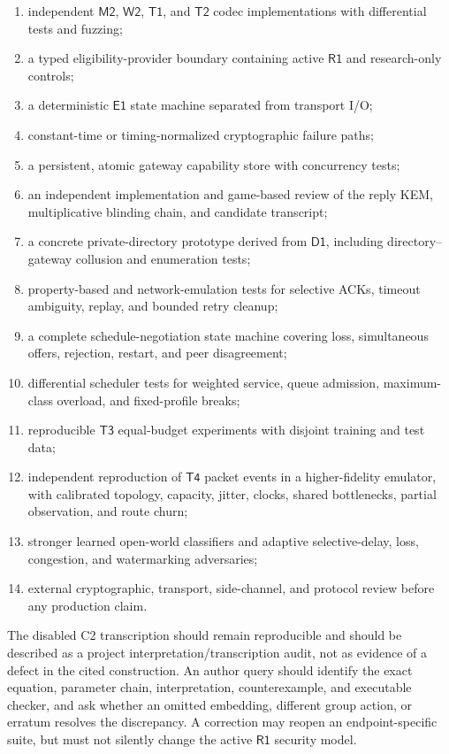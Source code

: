 \documentclass[11pt,oneside]{article}
\newcommand{\Eone}{\ensuremath{\mathsf{E1}}}
\newcommand{\Rone}{\ensuremath{\mathsf{R1}}}
\newcommand{\Mtwo}{\ensuremath{\mathsf{M2}}}
\newcommand{\Wtwo}{\ensuremath{\mathsf{W2}}}
\newcommand{\Tone}{\ensuremath{\mathsf{T1}}}
\newcommand{\Ttwo}{\ensuremath{\mathsf{T2}}}
\newcommand{\Tthree}{\ensuremath{\mathsf{T3}}}
\newcommand{\Tfour}{\ensuremath{\mathsf{T4}}}
\newcommand{\Done}{\ensuremath{\mathsf{D1}}}
\begin{document}
\begin{enumerate}
  \item independent \Mtwo{}, \Wtwo{}, \Tone{}, and \Ttwo{} codec implementations with differential tests and fuzzing;
  \item a typed eligibility-provider boundary containing active \Rone{} and research-only controls;
  \item a deterministic \Eone{} state machine separated from transport I/O;
  \item constant-time or timing-normalized cryptographic failure paths;
  \item a persistent, atomic gateway capability store with concurrency tests;
  \item an independent implementation and game-based review of the reply KEM, multiplicative blinding chain, and candidate transcript;
  \item a concrete private-directory prototype derived from \Done{}, including directory--gateway collusion and enumeration tests;
  \item property-based and network-emulation tests for selective ACKs, timeout ambiguity, replay, and bounded retry cleanup;
  \item a complete schedule-negotiation state machine covering loss, simultaneous offers, rejection, restart, and peer disagreement;
  \item differential scheduler tests for weighted service, queue admission, maximum-class overload, and fixed-profile breaks;
  \item reproducible \Tthree{} equal-budget experiments with disjoint training and test data;
  \item independent reproduction of \Tfour{} packet events in a higher-fidelity emulator, with calibrated topology, capacity, jitter, clocks, shared bottlenecks, partial observation, and route churn;
  \item stronger learned open-world classifiers and adaptive selective-delay, loss, congestion, and watermarking adversaries;
  \item external cryptographic, transport, side-channel, and protocol review before any production claim.
\end{enumerate}

The disabled C2 transcription should remain reproducible and should be described as a project interpretation/transcription audit, not as evidence of a defect in the cited construction. An author query should identify the exact equation, parameter chain, interpretation, counterexample, and executable checker, and ask whether an omitted embedding, different group action, or erratum resolves the discrepancy. A correction may reopen an endpoint-specific suite, but must not silently change the active \Rone{} security model.
\end{document}
